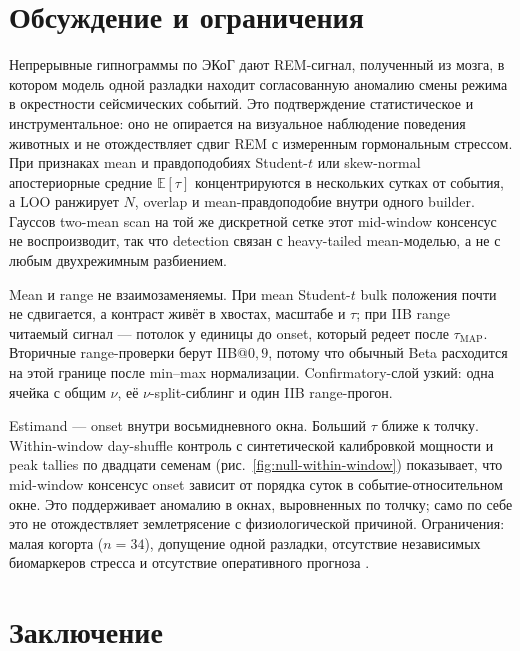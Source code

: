 \section{Обсуждение и ограничения}

Непрерывные гипнограммы по ЭКоГ дают REM-сигнал, полученный из мозга, в котором модель одной разладки находит согласованную аномалию смены режима в окрестности сейсмических событий. Это подтверждение статистическое и инструментальное: оно не опирается на визуальное наблюдение поведения животных и не отождествляет сдвиг REM с измеренным гормональным стрессом. При признаках mean и правдоподобиях Student-\(t\) или skew-normal апостериорные средние \(\mathbb{E}[\tau]\) концентрируются в нескольких сутках от события, а LOO ранжирует \(N\), overlap и mean-правдоподобие внутри одного builder. Гауссов two-mean scan на той же дискретной сетке этот mid-window консенсус не воспроизводит, так что detection связан с heavy-tailed mean-моделью, а не с любым двухрежимным разбиением.

Mean и range не взаимозаменяемы. При mean Student-\(t\) bulk положения почти не сдвигается, а контраст живёт в хвостах, масштабе и \(\tau\); при IIB range читаемый сигнал --- потолок у единицы до onset, который редеет после \(\tau_{\mathrm{MAP}}\). Вторичные range-проверки берут IIB@\(0{,}9\), потому что обычный Beta расходится на этой границе после min–max нормализации. Confirmatory-слой узкий: одна ячейка с общим \(\nu\), её \(\nu\)-split-сиблинг и один IIB range-прогон.

Estimand — onset внутри восьмидневного окна. Больший \(\tau\) ближе к толчку. Within-window day-shuffle контроль с синтетической калибровкой мощности и peak tallies по двадцати семенам (рис.~\ref{fig:null-within-window}) показывает, что mid-window консенсус onset зависит от порядка суток в событие-относительном окне. Это поддерживает аномалию в окнах, выровненных по толчку; само по себе это не отождествляет землетрясение с физиологической причиной. Ограничения: малая когорта (\(n=34\)), допущение одной разладки, отсутствие независимых биомаркеров стресса и отсутствие оперативного прогноза \cite{Geller1997}.

\section{Заключение}

